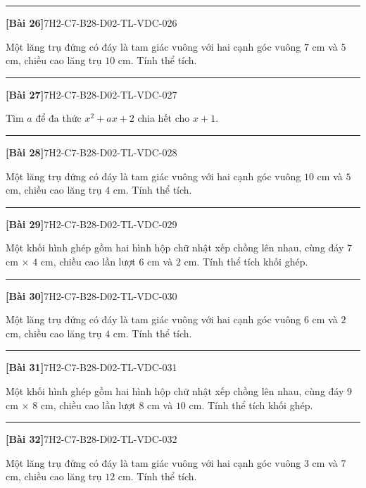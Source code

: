 \documentclass[12pt,a4paper]{article}
\newif\ifloigiai
\newenvironment{cauhoi}[2]{%
  \par\medskip\noindent\rule{\textwidth}{0.4pt}\par\nopagebreak
  \noindent\textbf{[#1]}\hfill{\scriptsize\ttfamily #2}\par\nopagebreak\smallskip}{\par}
\newcommand{\loigiai}[1]{\ifloigiai\par\smallskip\noindent\textit{Lời giải.} #1\par\fi}
\begin{document}
\begin{cauhoi}{Bài 26}{7H2-C7-B28-D02-TL-VDC-026}
Một lăng trụ đứng có đáy là tam giác vuông với hai cạnh góc vuông $7$ cm và $5$ cm, chiều cao lăng trụ $10$ cm. Tính thể tích.
\loigiai{Diện tích đáy là $\dfrac{7\cdot 5}{2}=17,5$ ($\text{cm}^2$). Thể tích là $17,5\cdot 10=175$ ($\text{cm}^3$).}
\end{cauhoi}
\begin{cauhoi}{Bài 27}{7H2-C7-B28-D02-TL-VDC-027}
Tìm $a$ để đa thức $x^{2}+ax+2$ chia hết cho $x+1$.
\loigiai{Đa thức chia hết cho $x+1$ khi $x=-1$ là nghiệm: $1-a+2=0$, suy ra $a=3$.}
\end{cauhoi}
\begin{cauhoi}{Bài 28}{7H2-C7-B28-D02-TL-VDC-028}
Một lăng trụ đứng có đáy là tam giác vuông với hai cạnh góc vuông $10$ cm và $5$ cm, chiều cao lăng trụ $4$ cm. Tính thể tích.
\loigiai{Diện tích đáy là $\dfrac{10\cdot 5}{2}=25$ ($\text{cm}^2$). Thể tích là $25\cdot 4=100$ ($\text{cm}^3$).}
\end{cauhoi}
\begin{cauhoi}{Bài 29}{7H2-C7-B28-D02-TL-VDC-029}
Một khối hình ghép gồm hai hình hộp chữ nhật xếp chồng lên nhau, cùng đáy $7$ cm $\times$ $4$ cm, chiều cao lần lượt $6$ cm và $2$ cm. Tính thể tích khối ghép.
\loigiai{Thể tích hai khối là $7\cdot 4\cdot 6=168$ và $7\cdot 4\cdot 2=56$ ($\text{cm}^3$). Thể tích khối ghép là $168+56=224$ ($\text{cm}^3$).}
\end{cauhoi}
\begin{cauhoi}{Bài 30}{7H2-C7-B28-D02-TL-VDC-030}
Một lăng trụ đứng có đáy là tam giác vuông với hai cạnh góc vuông $6$ cm và $2$ cm, chiều cao lăng trụ $4$ cm. Tính thể tích.
\loigiai{Diện tích đáy là $\dfrac{6\cdot 2}{2}=6$ ($\text{cm}^2$). Thể tích là $6\cdot 4=24$ ($\text{cm}^3$).}
\end{cauhoi}
\begin{cauhoi}{Bài 31}{7H2-C7-B28-D02-TL-VDC-031}
Một khối hình ghép gồm hai hình hộp chữ nhật xếp chồng lên nhau, cùng đáy $9$ cm $\times$ $8$ cm, chiều cao lần lượt $8$ cm và $10$ cm. Tính thể tích khối ghép.
\loigiai{Thể tích hai khối là $9\cdot 8\cdot 8=576$ và $9\cdot 8\cdot 10=720$ ($\text{cm}^3$). Thể tích khối ghép là $576+720=1296$ ($\text{cm}^3$).}
\end{cauhoi}
\begin{cauhoi}{Bài 32}{7H2-C7-B28-D02-TL-VDC-032}
Một lăng trụ đứng có đáy là tam giác vuông với hai cạnh góc vuông $3$ cm và $7$ cm, chiều cao lăng trụ $12$ cm. Tính thể tích.
\loigiai{Diện tích đáy là $\dfrac{3\cdot 7}{2}=10,5$ ($\text{cm}^2$). Thể tích là $10,5\cdot 12=126$ ($\text{cm}^3$).}
\end{cauhoi}
\end{document}
